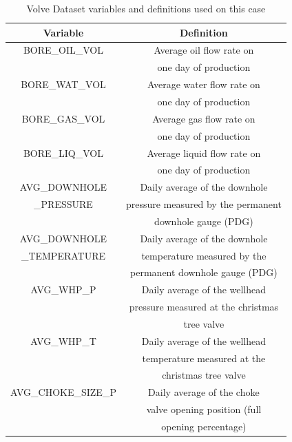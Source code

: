 \documentclass[conference]{IEEEtran}
\begin{document}
\begin{table}[htbp]
\caption{Volve Dataset variables and definitions used on this case}
\begin{center}
\centering
\begin{tabular}{|c|c|}
\hline
\textbf{Variable}&{\textbf{Definition}} \\
\hline
BORE\_OIL\_VOL             & Average oil flow rate on \\
                           &  one day of production\\
\hline
BORE\_WAT\_VOL             & Average water flow rate on \\
                           & one day of production\\
\hline
BORE\_GAS\_VOL             & Average gas flow rate on \\
                           & one day of production\\
\hline
BORE\_LIQ\_VOL            & Average liquid flow rate on \\
                           & one day of production\\
\hline
AVG\_DOWNHOLE               &  Daily average of the downhole\\             
\_PRESSURE                  &  pressure measured by the permanent\\
                            &  downhole gauge (PDG)\\
\hline
AVG\_DOWNHOLE               &   Daily average of the downhole\\
\_TEMPERATURE               &  temperature measured by the \\
                            &  permanent downhole gauge (PDG)\\
\hline
AVG\_WHP\_P                &   Daily average of the wellhead\\
                           &  pressure measured at the christmas\\
                           &  tree valve\\
\hline
AVG\_WHP\_T                &   Daily average of the wellhead\\
                           &  temperature measured at the \\
                           &  christmas tree valve\\
\hline
AVG\_CHOKE\_SIZE\_P        &   Daily average of the choke   \\
                           &   valve opening position (full \\
                           &   opening percentage)          \\

\end{tabular}
\end{center}
\end{table}
\end{document}
